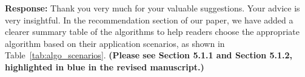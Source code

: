 \documentclass[sigconf, nonacm]{acmart}
\begin{document}
\noindent
\textbf{Response:} Thank you very much for your valuable suggestions. Your advice is very insightful. In the recommendation section of our paper, we have added a clearer summary table of the algorithms to help readers choose the appropriate algorithm based on their application scenarios, as shown in Table~\ref{tab:algo_scenarios}. \textbf{(Please see Section 5.1.1 and Section 5.1.2, highlighted in blue in the revised manuscript.)}


\end{document}
